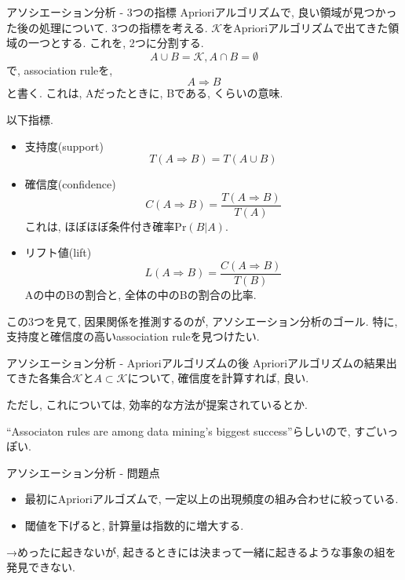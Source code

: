 \documentclass[dvipdfmx,8pt]{beamer}
\begin{document}
  \begin{frame}{アソシエーション分析 - 3つの指標}
    Aprioriアルゴリズムで, 良い領域が見つかった後の処理について.
    3つの指標を考える.
    $\mathcal{K}$をAprioriアルゴリズムで出てきた領域の一つとする.
    これを, 2つに分割する.
    \[
      A \cup B = \mathcal{K}, A \cap B = \emptyset
    \]
    で, association ruleを,
    \[
      A \Rightarrow B
    \]
    と書く. これは, Aだったときに, Bである, くらいの意味.

    以下指標.
    \begin{itemize}
      \item 支持度(support)
        \[
          T(A \Rightarrow B)=T(A \cup B)
        \]
      \item 確信度(confidence)
        \[
          C(A \Rightarrow B)=\frac{T(A \Rightarrow B)}{T(A)}
        \]
        これは, ほぼほぼ条件付き確率$\mathrm{Pr}(B|A)$.
      \item リフト値(lift)
        \[
          L(A \Rightarrow B)=\frac{C(A \Rightarrow B)}{T(B)}
        \]
        Aの中のBの割合と, 全体の中のBの割合の比率.
    \end{itemize}
    この3つを見て, 因果関係を推測するのが, アソシエーション分析のゴール.
    特に, 支持度と確信度の高いassociation ruleを見つけたい.

  \end{frame}
  \begin{frame}{アソシエーション分析 - Aprioriアルゴリズムの後}
    Aprioriアルゴリズムの結果出てきた各集合$\mathcal{K}$と$A\subset
    \mathcal{K}$について, 確信度を計算すれば, 良い.

    ただし, これについては, 効率的な方法が提案されているとか.

    ``Associaton rules are among data mining's biggest success''らしいので,
    すごいっぽい.

  \end{frame}
  \begin{frame}{アソシエーション分析 - 問題点}
    \begin{itemize}
      \item 最初にAprioriアルゴズムで, 一定以上の出現頻度の組み合わせに絞っている.
      \item 閾値を下げると, 計算量は指数的に増大する.
    \end{itemize}
    →めったに起きないが, 起きるときには決まって一緒に起きるような事象の組を発見できない.
  \end{frame}
\end{document}
